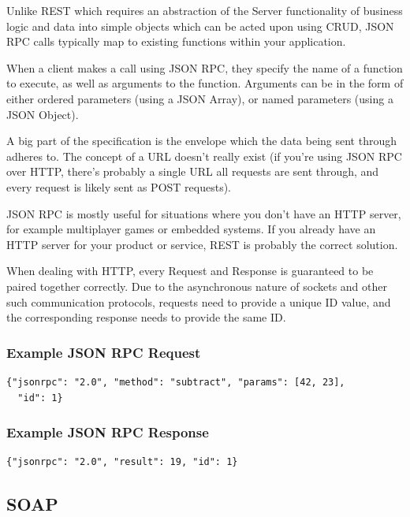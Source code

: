 \documentclass{book}
\begin{document}
Unlike REST which requires an abstraction of the Server functionality of business logic and data into simple objects which can be acted upon using CRUD, JSON RPC calls typically map to existing functions within your application.

When a client makes a call using JSON RPC, they specify the name of a function to execute, as well as arguments to the function. Arguments can be in the form of either ordered parameters (using a JSON Array), or named parameters (using a JSON Object).

A big part of the specification is the envelope which the data being sent through adheres to. The concept of a URL doesn't really exist (if you're using JSON RPC over HTTP, there's probably a single URL all requests are sent through, and every request is likely sent as POST requests).

JSON RPC is mostly useful for situations where you don't have an HTTP server, for example multiplayer games or embedded systems. If you already have an HTTP server for your product or service, REST is probably the correct solution.

When dealing with HTTP, every Request and Response is guaranteed to be paired together correctly. Due to the asynchronous nature of sockets and other such communication protocols, requests need to provide a unique ID value, and the corresponding response needs to provide the same ID.

\subsubsection{Example JSON RPC Request}

\begin{verbatim}
{"jsonrpc": "2.0", "method": "subtract", "params": [42, 23],
  "id": 1}
\end{verbatim}

\subsubsection{Example JSON RPC Response}

\begin{verbatim}
{"jsonrpc": "2.0", "result": 19, "id": 1}
\end{verbatim}


\subsection{SOAP}
\end{document}
